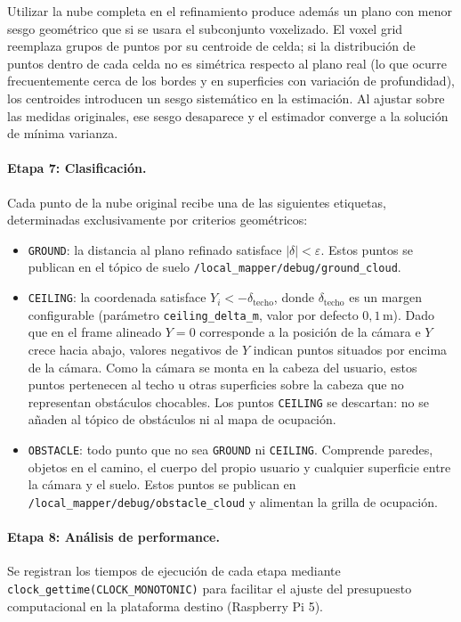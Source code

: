 Utilizar la nube completa en el refinamiento produce además un plano
con menor sesgo geométrico que si se usara el subconjunto voxelizado.
El voxel grid reemplaza grupos de puntos por su centroide de celda; si
la distribución de puntos dentro de cada celda no es simétrica respecto
al plano real (lo que ocurre frecuentemente cerca de los bordes y en
superficies con variación de profundidad), los centroides introducen un
sesgo sistemático en la estimación. Al ajustar sobre las
medidas originales, ese sesgo desaparece y el estimador converge a la
solución de mínima varianza.

\paragraph{Etapa 7: Clasificación.}
Cada punto de la nube original recibe una de las siguientes etiquetas,
determinadas exclusivamente por criterios geométricos:
\begin{itemize}
  \item \texttt{GROUND}: la distancia al plano refinado satisface
        $|\delta| < \varepsilon$. Estos puntos se publican en el tópico
        de suelo \texttt{/local\_mapper/debug/ground\_cloud}.

  \item \texttt{CEILING}: la coordenada satisface $Y_i <
        -\delta_{\text{techo}}$, donde $\delta_{\text{techo}}$ es un
        margen configurable (parámetro \texttt{ceiling\_delta\_m},
        valor por defecto $0{,}1\,\text{m}$). Dado que en el frame
        alineado $Y = 0$ corresponde a la posición de la cámara e $Y$
        crece hacia abajo, valores negativos de $Y$ indican puntos
        situados por encima de la cámara. Como la cámara se monta en
        la cabeza del usuario, estos puntos pertenecen al techo u
        otras superficies sobre la cabeza que no representan obstáculos
        chocables. Los puntos \texttt{CEILING} se descartan: no se
        añaden al tópico de obstáculos ni al mapa de ocupación.

  \item \texttt{OBSTACLE}: todo punto que no sea \texttt{GROUND} ni
        \texttt{CEILING}. Comprende paredes, objetos en el camino, el
        cuerpo del propio usuario y cualquier superficie entre la cámara
        y el suelo. Estos puntos se publican en
        \texttt{/local\_mapper/debug/obstacle\_cloud} y alimentan la
        grilla de ocupación.
\end{itemize}

\paragraph{Etapa 8: Análisis de performance.}
Se registran los tiempos de ejecución de cada etapa mediante
\texttt{clock\_gettime(CLOCK\_MONOTONIC)} para facilitar el ajuste del
presupuesto computacional en la plataforma destino (Raspberry Pi 5).

